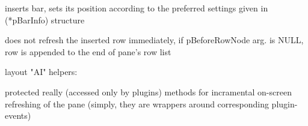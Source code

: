 
inserts bar, sets its position according to the preferred settings
given in (*pBarInfo) structure


\label{cbdockpaneinsertrow}


does not refresh the inserted row immediately,
if pBeforeRowNode arg. is NULL, row is appended to the end of pane's row list


\label{cbdockpaneisfixedsize}


layout "AI" helpers:


\label{cbdockpaneishorizontal}



\label{cbdockpanematchesmask}



\label{cbdockpanepaintbar}



\label{cbdockpanepaintbardecorations}


protected really (accessed only by plugins) methods for incramental on-screen refreshing of the pane
(simply, they are wrappers around corresponding plugin-events)


\label{cbdockpanepaintbarhandles}



\label{cbdockpanepaintpane}



\label{cbdockpanepaintpanebackground}




